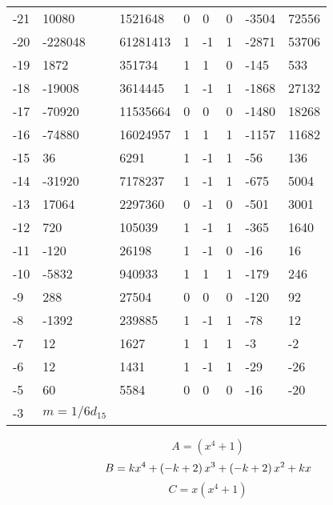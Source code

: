 \documentclass{amsart}
\begin{document}
\begin{longtable}{|l|l|l|lllll|}
-21&10080&1521648&0&0&0&-3504&72556\\
-20&-228048&61281413&1&-1&1&-2871&53706\\
-19&1872&351734&1&1&0&-145&533\\
-18&-19008&3614445&1&-1&1&-1868&27132\\
-17&-70920&11535664&0&0&0&-1480&18268\\
-16&-74880&16024957&1&1&1&-1157&11682\\
-15&36&6291&1&-1&1&-56&136\\
-14&-31920&7178237&1&-1&1&-675&5004\\
-13&17064&2297360&0&-1&0&-501&3001\\
-12&720&105039&1&-1&1&-365&1640\\
-11&-120&26198&1&-1&0&-16&16\\
-10&-5832&940933&1&1&1&-179&246\\
-9&288&27504&0&0&0&-120&92\\
-8&-1392&239885&1&-1&1&-78&12\\
-7&12&1627&1&1&1&-3&-2\\
-6&12&1431&1&-1&1&-29&-26\\
-5&60&5584&0&0&0&-16&-20\\
-3&$m=1/6d_{15}$&&\multicolumn{5}{c|}{}\\
\hline
\end{longtable}
$$A=(x^4
 + 1)$$
$$B=k\*x^4
 + \left(-k
 + 2\right) \*x^3
 + \left(-k
 + 2\right) \*x^2
 + k\*x$$
$$C=x(x^4
 + 1)$$
\end{document}
